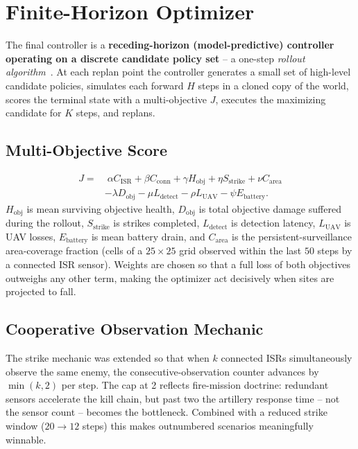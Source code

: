 \documentclass[conference]{IEEEtran}
\begin{document}
\section{Finite-Horizon Optimizer}
The final controller is a \textbf{receding-horizon (model-predictive) controller
operating on a discrete candidate policy set} -- a one-step \textit{rollout
algorithm}~\cite{bertsekas_rl_2019}. At each replan point the controller
generates a small set of high-level candidate policies, simulates each forward
$H$ steps in a cloned copy of the world, scores the terminal state with a
multi-objective $J$, executes the maximizing candidate for $K$ steps, and
replans.

\subsection{Multi-Objective Score}
\begin{equation}
\begin{aligned}
J = &\;\alpha C_{\text{ISR}} + \beta C_{\text{conn}}
+ \gamma H_{\text{obj}} + \eta S_{\text{strike}} + \nu C_{\text{area}} \\
&- \lambda D_{\text{obj}} - \mu L_{\text{detect}}
- \rho L_{\text{UAV}} - \psi E_{\text{battery}}.
\end{aligned}
\label{eq:horizon_obj}
\end{equation}
$H_{\text{obj}}$ is mean surviving objective health, $D_{\text{obj}}$ is total
objective damage suffered during the rollout, $S_{\text{strike}}$ is strikes
completed, $L_{\text{detect}}$ is detection latency, $L_{\text{UAV}}$ is UAV
losses, $E_{\text{battery}}$ is mean battery drain, and $C_{\text{area}}$ is
the persistent-surveillance area-coverage fraction (cells of a $25\times25$
grid observed within the last $50$ steps by a connected ISR sensor).
Weights are chosen so that a full loss of both objectives outweighs any
other term, making the optimizer act decisively when sites are projected to
fall.

\subsection{Cooperative Observation Mechanic}
The strike mechanic was extended so that when $k$ connected ISRs simultaneously
observe the same enemy, the consecutive-observation counter advances by
$\min(k, 2)$ per step. The cap at 2 reflects fire-mission doctrine:
redundant sensors accelerate the kill chain, but past two the artillery
response time -- not the sensor count -- becomes the bottleneck. Combined
with a reduced strike window ($20\to12$ steps) this makes outnumbered
scenarios meaningfully winnable.
\end{document}
